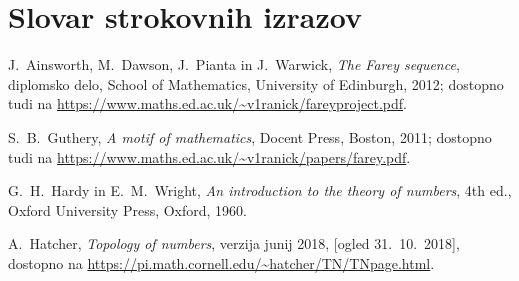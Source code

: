 \documentclass[mat1]{fmfdelo}
\begin{document}

\section*{Slovar strokovnih izrazov}

\geslo{}{}
\geslo{}{}

\begin{thebibliography}{99}

 J.~Ainsworth, M.~Dawson, J.~Pianta in J.~Warwick, \emph{The Farey sequence}, diplomsko delo, School of Mathematics, University of Edinburgh, 2012; dostopno tudi na \url{https://www.maths.ed.ac.uk/~v1ranick/fareyproject.pdf}.

 S.~B.~Guthery, \emph{A motif of mathematics}, Docent Press, Boston, 2011; dostopno tudi na \url{https://www.maths.ed.ac.uk/~v1ranick/papers/farey.pdf}.

 G.~H.~Hardy in E.~M.~Wright, \emph{An introduction to the theory of numbers}, 4th ed., Oxford University Press, Oxford, 1960.

 A.~Hatcher, \emph{Topology of numbers}, verzija junij 2018, [ogled 31.~10.~2018], dostopno na \url{https://pi.math.cornell.edu/~hatcher/TN/TNpage.html}.

\end{thebibliography}
\end{document}

